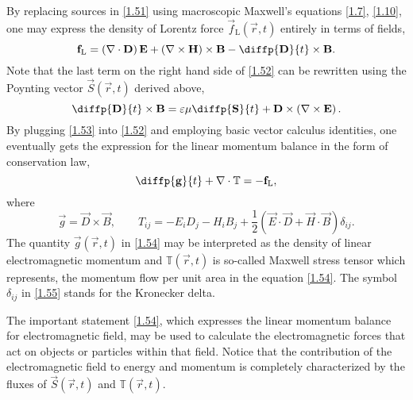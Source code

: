 By replacing sources in \ref{1.51} using macroscopic Maxwell's equations \ref{1.7}, \ref{1.10}, one may express the density of Lorentz force $ \vec{f}_\mathrm{L} \left( \vec{r}, t \right) $ entirely in terms of fields,
\begin{equation}
\label{1.52}
\vec{f}_\mathrm{L} = \left(\div{\vec{D}} \right) \vec{E} + \left(\rot{\vec{H}} \right) \times \vec{B} - \diffp{\vec{D}}{t} \times \vec{B}.
\end{equation}
Note that the last term on the right hand side of \ref{1.52} can be rewritten using the Poynting vector $ \vec{S}\left( \vec{r}, t \right) $ derived above, 
\begin{equation}
\label{1.53}
\diffp{\vec{D}}{t} \times \vec{B} = \varepsilon \mu \diffp{\vec{S}}{t} + \vec{D} \times \left(\rot{\vec{E}} \right).
\end{equation}
By plugging \ref{1.53} into \ref{1.52} and employing basic vector calculus identities, one eventually gets the expression for the linear momentum balance in the form of conservation law,
\begin{equation}
\label{1.54}
\diffp{\vec{g}}{t} + \div{\mathbb{T}} = -\vec{f}_\mathrm{L},
\end{equation}
where
\begin{equation}
\label{1.55}
\vec{g} = \vec{D} \times \vec{B}, \qquad T_{ij} = - E_i D_j - H_i B_j + \frac{1}{2} \left(\vec{E} \cdot \vec{D} + \vec{H} \cdot \vec{B} \right) \delta_{ij}.
\end{equation}
The quantity $ \vec{g}\left( \vec{r}, t \right) $ in \ref{1.54} may be interpreted as the density of linear electromagnetic momentum and $ \mathbb{T}\left( \vec{r}, t \right) $ is so-called Maxwell stress tensor which represents, the momentum flow per unit area in the equation \ref{1.54}. The symbol $ \delta_{ij} $ in \ref{1.55} stands for the Kronecker delta.

The important statement \ref{1.54}, which expresses the linear momentum balance for electromagnetic field, may be used to calculate the electromagnetic forces that act on objects or particles within that field. Notice that the contribution of the electromagnetic field to energy and momentum is completely characterized by the fluxes of $ \vec{S}\left( \vec{r}, t \right) $ and $ \mathbb{T}\left( \vec{r}, t \right) $.


